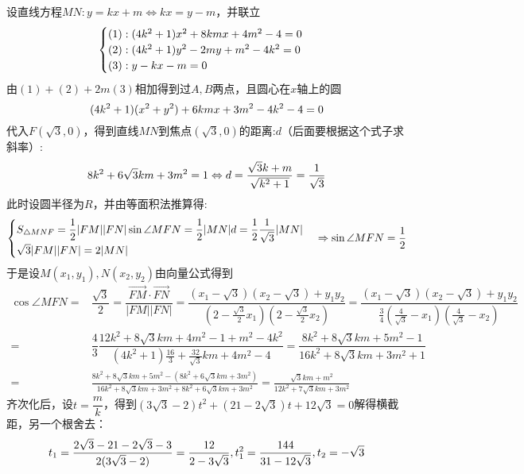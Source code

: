 \begin{solution}
    设直线方程$MN:y=kx+m\Leftrightarrow kx=y-m$，并联立
    \vspace{-5pt}
    \[\begin{cases}(1):(4k^2+1)x^2+8kmx+4m^2-4=0\\(2):(4k^2+1)y^2-2my+m^2-4k^2=0\\(3):y-kx-m=0\end{cases}\vspace{-5pt}\]
    由$(1)+(2)+2m(3)$相加得到过$A,B$两点，且圆心在$x$轴上的圆\vspace{-5pt}
    \[(4k^2+1)(x^2+y^2)+6kmx+3m^2-4k^2-4=0\vspace{-5pt}\]
    代入$F(\sqrt3,0)$，得到直线$MN$到焦点$(\sqrt3,0)$的距离:$d$（后面要根据这个式子求斜率）:\vspace{-5pt}
    \[8k^2+6\sqrt{3}km+3m^2=1\Leftrightarrow d=\dfrac{\sqrt{3}k+m}{\sqrt{k^2+1}}=\dfrac{1}{\sqrt3}\vspace{-5pt}\]
    此时设圆半径为$R$，并由等面积法推算得:\vspace{-5pt}\[\begin{cases}S_{\triangle{MNF}}=\dfrac12|FM||FN|\sin\angle{MFN}=\dfrac12|MN|d=\dfrac{1}{2}\dfrac{1}{\sqrt3}|MN|\\\sqrt{3}|FM||FN|=2|MN|\end{cases}\Rightarrow \sin\angle{MFN}=\dfrac12\vspace{-5pt}\]
    于是设$M(x_1,y_1),N(x_2,y_2)$由向量公式得到
    \begin{align*}
        \cos\angle{MFN}=&\dfrac{\sqrt3}{2}=\dfrac{\overrightarrow{FM}\cdot\overrightarrow{FN}}{|FM||FN|}=\dfrac{(x_1-\sqrt3)(x_2-\sqrt3)+y_1y_2}{(2-\frac{\sqrt3}{2}x_1)(2-\frac{\sqrt3}{2}x_2)}=\dfrac{(x_1-\sqrt3)(x_2-\sqrt3)+y_1y_2}{\frac34(\frac{4}{\sqrt3}-x_1)(\frac{4}{\sqrt3}-x_2)}\\
        =&\dfrac{4}{3}\dfrac{12k^2+8\sqrt{3}km+4m^2-1+m^2-4k^2}{(4k^2+1)\frac{16}{3}+\frac{32}{\sqrt3}km+4m^2-4}=\dfrac{8k^2+8\sqrt{3}km+5m^2-1}{16k^2+8\sqrt{3}km+3m^2+1}\\
        =&\frac{8k^2+8\sqrt{3}km+5m^2-(8k^2+6\sqrt{3}km+3m^2)}{16k^2+8\sqrt{3}km+3m^2+8k^2+6\sqrt{3}km+3m^2}=\frac{\sqrt3km+m^2}{12k^2+7\sqrt3km+3m^2}
    \end{align*}
    齐次化后，设$t=\dfrac{m}{k}$，得到$(3\sqrt3-2)t^2+(21-2\sqrt3)t+12\sqrt3=0$解得横截距，另一个根舍去：\vspace{-5pt}
    \[t_1=\dfrac{2\sqrt3-21-2\sqrt3-3}{2(3\sqrt3-2)}=\dfrac{12}{2-3\sqrt3},t_1^2=\dfrac{144}{31-12\sqrt3},t_2=-\sqrt3\vspace{-5pt}\]

\end{solution}
